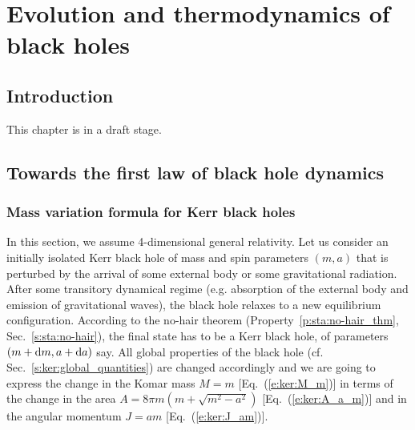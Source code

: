 \chapter{Evolution and thermodynamics of black holes}
\label{s:evo}

\minitoc

\section{Introduction}

This chapter is in a draft stage.

\section{Towards the first law of black hole dynamics}

\subsection{Mass variation formula for Kerr black holes}

In this section, we assume 4-dimensional general relativity.
Let us consider an initially isolated Kerr black hole of mass and spin parameters $(m,a)$
that is perturbed by the arrival of some external body or some gravitational
radiation. After some transitory dynamical regime (e.g. absorption of the
external body and emission of gravitational waves), the black hole relaxes
to a new equilibrium configuration. According to the
no-hair theorem (Property~\ref{p:sta:no-hair_thm}, Sec.~\ref{s:sta:no-hair}),
the final state has to be a Kerr black hole, of
parameters $(m+\mathrm{d} m, a+\mathrm{d} a)$ say. All global properties of the black
hole (cf. Sec.~\ref{s:ker:global_quantities})
are changed accordingly and we are going to express the change in
the Komar mass $M = m$ [Eq.~(\ref{e:ker:M_m})] in terms of the change in
the area $A = 8 \pi m (m + \sqrt{m^2-a^2})$ [Eq.~(\ref{e:ker:A_a_m})]
and in the angular momentum $J = a m$ [Eq.~(\ref{e:ker:J_am})].

